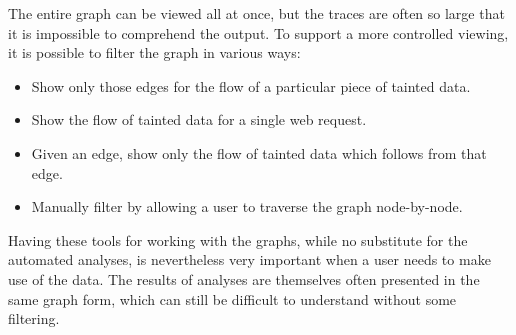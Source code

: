 \documentclass[msc,oneside]{ubcthesis}
\begin{document}
The entire graph can be viewed all at once, but the traces are often so large that it is impossible to comprehend the output. To support a more controlled viewing, it is possible to filter the graph in various ways:

\begin{itemize}
\item Show only those edges for the flow of a particular piece of tainted data.
\item Show the flow of tainted data for a single web request.
\item Given an edge, show only the flow of tainted data which follows from that edge.
\item Manually filter by allowing a user to traverse the graph node-by-node.
\end{itemize}

Having these tools for working with the graphs, while no substitute for the automated analyses, is nevertheless very important when a user needs to make use of the data. The results of analyses are themselves often presented in the same graph form, which can still be difficult to understand without some filtering.
\end{document}
